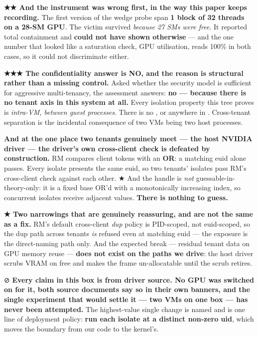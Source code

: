 \documentclass[10.5pt]{article}
\begin{document}
\textbf{★★ And the instrument was wrong first, in the way this paper keeps recording.} The first
version of the wedge probe span \textbf{1 block of 32 threads on a 28-SM GPU}. The victim survived
\emph{because 27 SMs were free}. It reported total containment and \textbf{could not have shown
otherwise} — and the one number that looked like a saturation check, GPU utilisation, reads 100\%
in both cases, so it could not discriminate either.

\begin{warnbox}\small
\textbf{★★★ The confidentiality answer is NO, and the reason is structural rather than a missing
control.} Asked whether the security model is sufficient for aggressive multi-tenancy, the
assessment answers: \textbf{no — because there is no tenant axis in this system at all.} Every
isolation property this tree proves is \emph{intra-VM, between guest processes}. There is no
,  or  anywhere in . Cross-tenant separation
is the incidental consequence of two VMs being two host processes.

\smallskip
\textbf{And at the one place two tenants genuinely meet — the host NVIDIA driver — the driver's
own cross-client check is defeated by construction.} RM compares client tokens with an
\textbf{OR}: a matching euid alone passes. Every isolate presents the same euid, so two tenants'
isolates pass RM's cross-client check against each other. ★ And the handle is \emph{not}
guessable-in-theory-only: it is a fixed base OR'd with a monotonically increasing index, so
concurrent isolates receive adjacent values. \textbf{There is nothing to guess.}

\smallskip
\textbf{★ Two narrowings that are genuinely reassuring, and are not the same as a fix.} RM's
default cross-client \emph{dup} policy is PID-scoped, not euid-scoped, so the dup path across
tenants \emph{is} refused even at matching euid — the exposure is the direct-naming path only.
And the expected break — residual tenant data on GPU memory reuse — \textbf{does not exist on the
paths we drive}: the host driver scrubs VRAM on free and makes the frame un-allocatable until the
scrub retires.

\smallskip
⊘ \textbf{Every claim in this box is \inferred{} from driver source. No GPU was switched on for
it, both source documents say so in their own banners, and the single experiment that would settle
it — two VMs on one box — has never been attempted.} The highest-value single change is named and
is one line of deployment policy: \textbf{run each isolate at a distinct non-zero uid}, which
moves the boundary from our code to the kernel's.
\end{warnbox}
\end{document}
